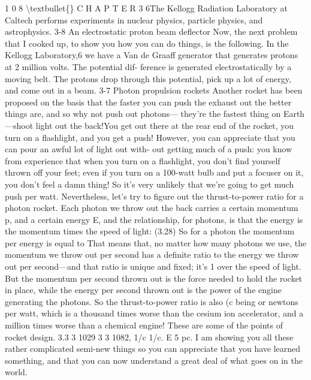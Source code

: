 \documentclass[10pt,oneside]{article}
\begin{document}
1 0 8 \textbackslash{}textbullet\{\} C H A P T E R  3 6The Kellogg Radiation Laboratory at Caltech performs experiments in nuclear physics, particle physics, and astrophysics. 3-8 An electrostatic proton beam deflector Now, the next problem that I cooked up, to show you how you can do things, is the following. In the Kellogg Laboratory,6 we have a Van de Graaff generator that generates protons at 2 million volts. The potential dif- ference is generated electrostatically by a moving belt. The protons drop through this potential, pick up a lot of energy, and come out in a beam. 3-7 Photon propulsion rockets Another rocket has been proposed on the basis that the faster you can push the exhaust out the better things are, and so why not push out photons--- they’re the fastest thing on Earth---shoot light out the back!You get out there at the rear end of the rocket, you turn on a flashlight, and you get a push! However, you can appreciate that you can pour an awful lot of light out with- out getting much of a push: you know from experience that when you turn on a flashlight, you don’t find yourself thrown off your feet; even if you turn on a 100-watt bulb and put a focuser on it, you don’t feel a damn thing! So it’s very unlikely that we’re going to get much push per watt. Nevertheless, let’s try to figure out the thrust-to-power ratio for a photon rocket. Each photon we throw out the back carries a certain momentum p, and a certain energy E, and the relationship, for photons, is that the energy is the momentum times the speed of light: (3.28) So for a photon the momentum per energy is equal to That means that, no matter how many photons we use, the momentum we throw out per second has a definite ratio to the energy we throw out per second---and that ratio is unique and fixed; it’s 1 over the speed of light. But the momentum per second thrown out is the force needed to hold the rocket in place, while the energy per second thrown out is the power of the engine generating the photons. So the thrust-to-power ratio is also (c being or newtons per watt, which is a thousand times worse than the cesium ion accelerator, and a million times worse than a chemical engine! These are some of the points of rocket design. 3.3 3 1029 3 3 1082, 1/c 1/c. E 5 pc. I am showing you all these rather complicated semi-new things so you can appreciate that you have learned something, and that you can now understand a great deal of what goes on in the world.\par
\end{document}
